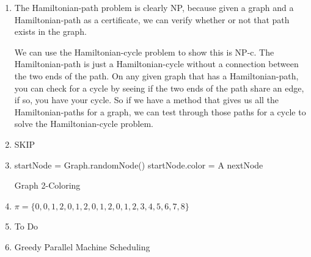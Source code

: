 \documentclass{article}
\begin{document}
\begin{enumerate}
\item
    The Hamiltonian-path problem is clearly NP, because given a graph and a Hamiltonian-path as a certificate, we can verify whether or not that path exists in the graph.
    
    We can use the Hamiltonian-cycle problem to show this is NP-c. The Hamiltonian-path is just a Hamiltonian-cycle without a connection between the two ends of the path. On any given graph that has a Hamiltonian-path, you can check for a cycle by seeing if the two ends of the path share an edge, if so, you have your cycle. So if we have a method that gives us all the Hamiltonian-paths for a graph, we can test through those paths for a cycle to solve the Hamiltonian-cycle problem.

\item  
    SKIP
    
\item
    \hspace*{.5em}\begin{minipage}{.99\linewidth}
        \begin{algorithm}[H]
            \SetAlgoLined
            \BlankLine
            startNode = Graph.randomNode()\;
            startNode.color = A\;
            nextNode\;
            \BlankLine
            \caption{Graph 2-Coloring}
        \end{algorithm}
    \end{minipage}
    
\item
    \(\pi = \{0,0,1,2,0,1,2,0,1,2,0,1,2,3,4,5,6,7,8\}\)
    
\item
    To Do
    
\item
    \hspace*{.5em}\begin{minipage}{.99\linewidth}
        \begin{algorithm}[H]
            \SetAlgoLined
            \BlankLine
            \caption{Greedy Parallel Machine Scheduling}
        \end{algorithm}
    \end{minipage}
    

\end{enumerate}
\end{document}

